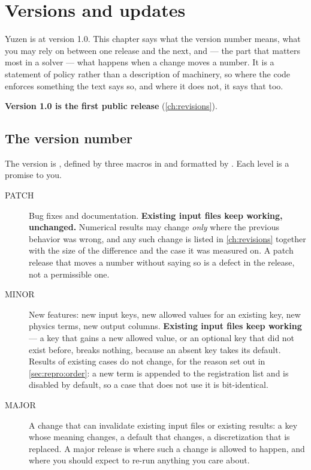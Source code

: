 \chapter{Versions and updates}
\label{ch:policy}

Yuzen is at version 1.0. This chapter says what the version number means, what
you may rely on between one release and the next, and --- the part that matters
most in a solver --- what happens when a change moves a number. It is a
statement of policy rather than a description of machinery, so where the code
enforces something the text says so, and where it does not, it says that too.

\textbf{Version 1.0 is the first public release} (\cref{ch:revisions}).

\section{The version number}
\label{sec:policy:scheme}

The version is , defined by three macros in
 and formatted by . Each
level is a promise to you.

\begin{description}

  \item[PATCH] Bug fixes and documentation. \textbf{Existing input files keep
    working, unchanged.} Numerical results may change \emph{only} where the
    previous behavior was wrong, and any such change is listed in
    \cref{ch:revisions} together with the size of the difference and the case
    it was measured on. A patch release that moves a number without saying so
    is a defect in the release, not a permissible one.

  \item[MINOR] New features: new input keys, new allowed values for an existing
    key, new physics terms, new output columns. \textbf{Existing input files
    keep working} --- a key that gains a new allowed value, or an optional key
    that did not exist before, breaks nothing, because an absent key takes its
    default. Results of existing cases do not change, for the reason set out in
    \cref{sec:repro:order}: a new term is appended to the registration list and
    is disabled by default, so a case that does not use it is bit-identical.

  \item[MAJOR] A change that can invalidate existing input files or existing
    results: a key whose meaning changes, a default that changes, a
    discretization that is replaced. A major release is where such a change is
    allowed to happen, and where you should expect to re-run anything you care
    about.

\end{description}


